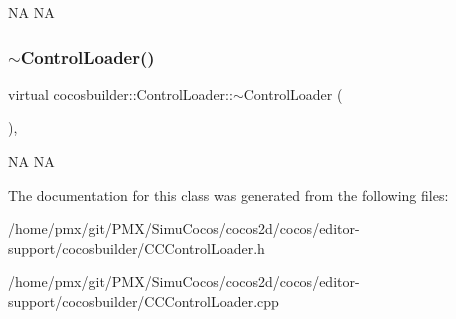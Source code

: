 NA  NA \mbox{\label{classcocosbuilder_1_1ControlLoader_adaea0700319b70e951a73dfb5b27c38e}} 
\subsubsection{\texorpdfstring{$\sim$\+Control\+Loader()}{~ControlLoader()}\hspace{0.1cm}{\footnotesize\ttfamily [2/2]}}
{\footnotesize\ttfamily virtual cocosbuilder\+::\+Control\+Loader\+::$\sim$\+Control\+Loader (\begin{DoxyParamCaption}{ }\end{DoxyParamCaption})\hspace{0.3cm}{\ttfamily [inline]}, {\ttfamily [virtual]}}

NA  NA 

The documentation for this class was generated from the following files\+:\begin{DoxyCompactItemize}
\item 
/home/pmx/git/\+P\+M\+X/\+Simu\+Cocos/cocos2d/cocos/editor-\/support/cocosbuilder/C\+C\+Control\+Loader.\+h\item 
/home/pmx/git/\+P\+M\+X/\+Simu\+Cocos/cocos2d/cocos/editor-\/support/cocosbuilder/C\+C\+Control\+Loader.\+cpp\end{DoxyCompactItemize}
